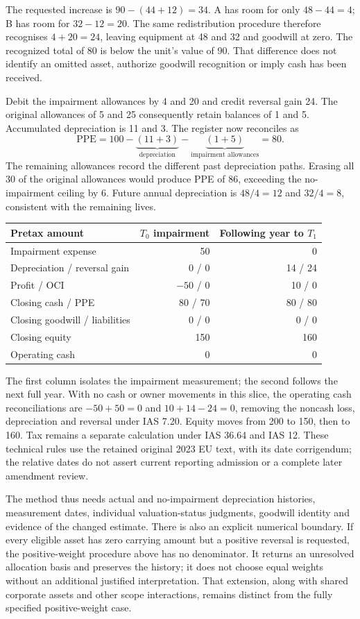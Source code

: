The requested increase is $90-(44+12)=34$. A has room for only $48-44=4$;
B has room for $32-12=20$. The same redistribution procedure therefore
recognises $4+20=24$, leaving equipment at 48 and 32 and goodwill at zero.
The recognized total of 80 is below the unit's value of 90. That difference
does not identify an omitted asset, authorize goodwill recognition or imply
cash has been received.

Debit the impairment allowances by 4 and 20 and credit reversal gain 24.
The original allowances of 5 and 25 consequently retain balances of 1 and 5.
Accumulated depreciation is 11 and 3. The register now reconciles as
\[
  \text{PPE}=100-\underbrace{(11+3)}_{\text{depreciation}}
                 -\underbrace{(1+5)}_{\text{impairment allowances}}=80.
\]
The remaining allowances record the different past depreciation paths.
Erasing all 30 of the original allowances would produce PPE of 86, exceeding
the no-impairment ceiling by 6. Future annual depreciation is $48/4=12$ and
$32/4=8$, consistent with the remaining lives.

\begin{center}
\begin{tabular}{@{}lrr@{}}
\toprule
Pretax amount & $T_0$ impairment & Following year to $T_1$\\
\midrule
Impairment expense & 50 & 0\\
Depreciation / reversal gain & 0 / 0 & 14 / 24\\
Profit / OCI & $-50$ / 0 & 10 / 0\\
Closing cash / PPE & 80 / 70 & 80 / 80\\
Closing goodwill / liabilities & 0 / 0 & 0 / 0\\
Closing equity & 150 & 160\\
Operating cash & 0 & 0\\
\bottomrule
\end{tabular}
\end{center}

The first column isolates the impairment measurement; the second follows the
next full year. With no cash or owner movements in this slice, the operating
cash reconciliations are $-50+50=0$ and $10+14-24=0$, removing the noncash
loss, depreciation and reversal under IAS 7.20. Equity moves from 200 to
150, then to 160. Tax remains a separate calculation under IAS 36.64 and
IAS 12. These technical rules use the retained original 2023 EU text, with
its date corrigendum; the relative dates do not assert current reporting
admission or a complete later amendment review.

The method thus needs actual and no-impairment depreciation histories,
measurement dates, individual valuation-status judgments, goodwill identity
and evidence of the changed estimate. There is also an explicit numerical
boundary. If every eligible asset has zero carrying amount but a positive
reversal is requested, the positive-weight procedure above has no denominator.
It returns an unresolved allocation basis and preserves the history; it does
not choose equal weights without an additional justified interpretation.
That extension, along with shared corporate assets and other scope
interactions, remains distinct from the fully specified positive-weight case.

